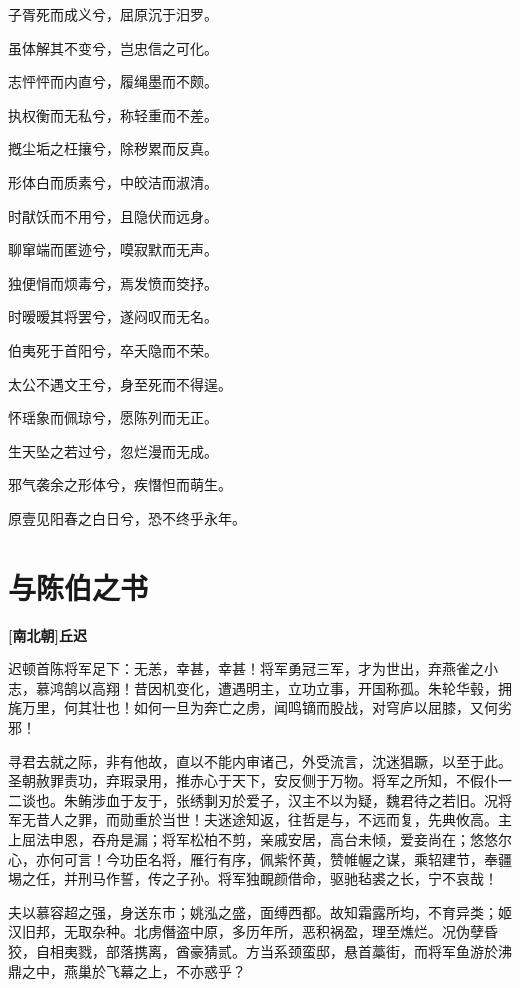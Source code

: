 \documentclass[UTF8,titlepage,oneside]{ctexbook}
\begin{document}
\begin{center}
    子胥死而成义兮，屈原沉于汨罗。
    
    虽体解其不变兮，岂忠信之可化。
    
    志怦怦而内直兮，履绳墨而不颇。
    
    执权衡而无私兮，称轻重而不差。
    
    摡尘垢之枉攘兮，除秽累而反真。
    
    形体白而质素兮，中皎洁而淑清。
    
    时猒饫而不用兮，且隐伏而远身。
    
    聊窜端而匿迹兮，嗼寂默而无声。
    
    独便悁而烦毒兮，焉发愤而筊抒。
    
    时暧暧其将罢兮，遂闷叹而无名。
    
    伯夷死于首阳兮，卒夭隐而不荣。
    
    太公不遇文王兮，身至死而不得逞。
    
    怀瑶象而佩琼兮，愿陈列而无正。
    
    生天坠之若过兮，忽烂漫而无成。
    
    邪气袭余之形体兮，疾憯怛而萌生。
    
    原壹见阳春之白日兮，恐不终乎永年。
\end{center}



\chapter*{与陈伯之书}
\begin{center}
	\textbf{[南北朝]丘迟}
\end{center}

迟顿首陈将军足下：无恙，幸甚，幸甚！将军勇冠三军，才为世出，弃燕雀之小志，慕鸿鹄以高翔！昔因机变化，遭遇明主，立功立事，开国称孤。朱轮华毂，拥旄万里，何其壮也！如何一旦为奔亡之虏，闻鸣镝而股战，对穹庐以屈膝，又何劣邪！

寻君去就之际，非有他故，直以不能内审诸己，外受流言，沈迷猖蹶，以至于此。圣朝赦罪责功，弃瑕录用，推赤心于天下，安反侧于万物。将军之所知，不假仆一二谈也。朱鲔涉血于友于，张绣剚刃於爱子，汉主不以为疑，魏君待之若旧。况将军无昔人之罪，而勋重於当世！夫迷途知返，往哲是与，不远而复，先典攸高。主上屈法申恩，吞舟是漏；将军松柏不剪，亲戚安居，高台未倾，爱妾尚在；悠悠尔心，亦何可言！今功臣名将，雁行有序，佩紫怀黄，赞帷幄之谋，乘轺建节，奉疆埸之任，并刑马作誓，传之子孙。将军独靦颜借命，驱驰毡裘之长，宁不哀哉！

夫以慕容超之强，身送东市；姚泓之盛，面缚西都。故知霜露所均，不育异类；姬汉旧邦，无取杂种。北虏僭盗中原，多历年所，恶积祸盈，理至燋烂。况伪孽昏狡，自相夷戮，部落携离，酋豪猜贰。方当系颈蛮邸，悬首藁街，而将军鱼游於沸鼎之中，燕巢於飞幕之上，不亦惑乎？
\end{document}
